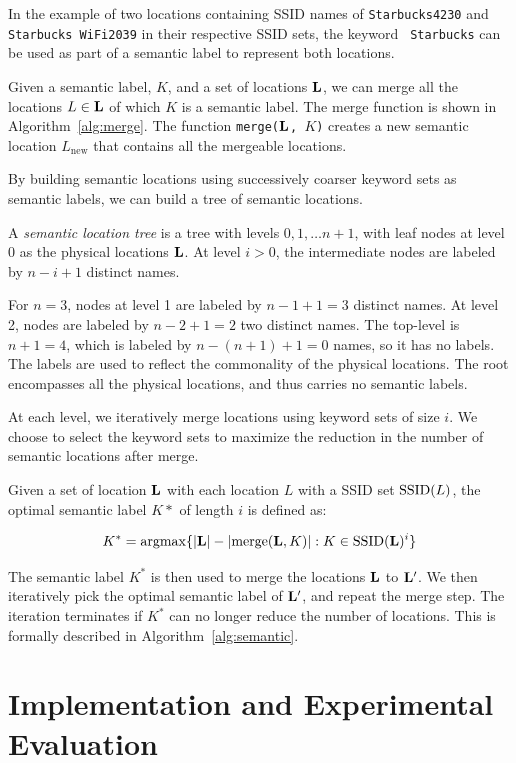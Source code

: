 In the example of two locations containing SSID names of {\tt Starbucks4230} and
{\tt Starbucks WiFi2039} in their respective SSID sets, the keyword {\tt
Starbucks} can be used as part of a semantic label to represent both locations.

Given a semantic label, $K$, and a set of locations $\mathbf{L}$, we can merge all the
locations $L\in \mathbf{L}$ of which $K$ is a semantic label.  The merge function is
shown in Algorithm~\ref{alg:merge}.  The function {\tt merge($\mathbf{L}$, $K$)} 
creates a new semantic location $L_\mathrm{new}$ that contains all the mergeable
locations.

By building semantic locations using successively coarser keyword sets as
semantic labels, we can build a tree of semantic locations.

\begin{definition}
    A {\em semantic location tree} is a tree with levels $0, 1, \dots n+1$, with leaf nodes at
    level 0 as the physical locations $\mathbf{L}$.  At level $i>0$, the intermediate
    nodes are labeled by $n-i+1$ distinct names.
\end{definition}

For $n=3$, nodes at level 1 are labeled by $n-1+1=3$ distinct names.  At level
2, nodes are labeled by $n-2+1=2$ two distinct names.  The top-level is $n+1=4$,
which is labeled by $n-(n+1)+1 = 0$ names, so it has no labels.
The labels are used to reflect the commonality of the physical locations.
The root encompasses all the physical locations, and thus carries no semantic
labels.

At each level,  we iteratively merge locations using keyword sets of size
$i$.  We choose to select the keyword sets 
to maximize the reduction in the number of semantic locations after
merge.

Given a set of location $\mathbf{L}$ with each location $L$ with a SSID set $\mathrm{SSID}(L)$,
the optimal semantic label $K*$ of length $i$ is defined as:

$$ K^* = \mathrm{argmax} \{|\mathbf{L}| - |\mathrm{merge}(\mathbf{L}, K)| : K\in\mathrm{SSID}(\mathbf{L})^i\}$$

The semantic label $K^*$ is then used to merge the locations $\mathbf{L}$ to $\mathbf{L}'$.  We then
iteratively pick the optimal semantic label of $\mathbf{L}'$, and repeat the merge
step.  The iteration terminates if $K^*$ can no longer reduce the number of locations.
This is formally described in Algorithm~\ref{alg:semantic}.

\section{Implementation and Experimental Evaluation}


